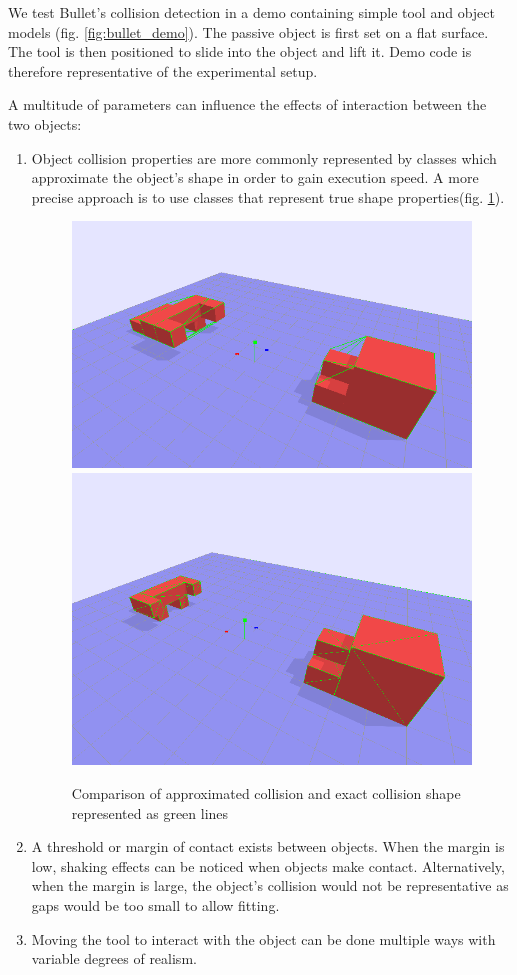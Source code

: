 \documentclass[11]{article}
\begin{document}
We test Bullet's collision detection in a demo containing simple tool and object models (fig. \ref{fig:bullet_demo}).
The passive object is first set on a flat surface.
The tool is then positioned to slide into the object and lift it.
Demo code is therefore representative of the experimental setup.  

A multitude of parameters can influence the effects of interaction between the two objects:
\begin{enumerate}
\item Object collision properties are more commonly represented by classes which approximate the object's shape in order to gain execution speed.
A more precise approach is to use classes that represent true shape properties(fig. \ref{fig:collision_shape}).   

\begin{figure}[h]
\centering
\includegraphics[width=.48\textwidth]{figures/collision_approximation.png}
\includegraphics[width=.41\textwidth]{figures/collision_exact.png}
\caption{Comparison of approximated collision and exact collision shape represented as green lines}
\label{fig:collision_shape}
\end{figure}      

\item A threshold or margin of contact exists between objects. 
When the margin is low, shaking effects can be noticed when objects make contact. 
Alternatively, when the margin is large, the object's collision would not be representative as gaps would be too small to allow fitting. 

\item Moving the tool to interact with the object can be done multiple ways with variable degrees of realism.
\end{enumerate}
\end{document}
